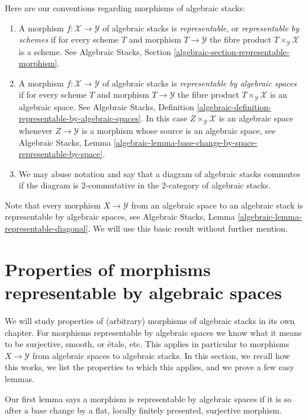 \documentclass{stacks-project}
\theoremstyle{plain}
\theoremstyle{definition}
\theoremstyle{remark}
\numberwithin{equation}{subsection}
\begin{document}
Here are our conventions regarding morphisms of algebraic stacks:
\begin{enumerate}
\item A morphism $f : \mathcal{X} \to \mathcal{Y}$
of algebraic stacks is {\it representable}, or
{\it representable by schemes} if for every scheme
$T$ and morphism $T \to \mathcal{Y}$ the fibre product
$T \times_\mathcal{Y} \mathcal{X}$ is a scheme.
See
Algebraic Stacks, Section \ref{algebraic-section-representable-morphism}.
\item A morphism $f : \mathcal{X} \to \mathcal{Y}$
of algebraic stacks is {\it representable by algebraic spaces}
if for every scheme $T$ and morphism $T \to \mathcal{Y}$ the fibre product
$T \times_\mathcal{Y} \mathcal{X}$ is an algebraic space.
See Algebraic Stacks,
Definition \ref{algebraic-definition-representable-by-algebraic-spaces}.
In this case $Z \times_\mathcal{Y} \mathcal{X}$ is an algebraic
space whenever $Z \to \mathcal{Y}$ is a morphism whose source is
an algebraic space, see
Algebraic Stacks,
Lemma \ref{algebraic-lemma-base-change-by-space-representable-by-space}.
\item We may abuse notation and say that a diagram of algebraic stacks
commutes if the diagram is $2$-commutative in the $2$-category of
algebraic stacks.
\end{enumerate}
Note that every morphism $X \to \mathcal{Y}$ from an algebraic space
to an algebraic stack is representable by algebraic spaces, see
Algebraic Stacks, Lemma \ref{algebraic-lemma-representable-diagonal}.
We will use this basic result without further mention.




\section{Properties of morphisms representable by algebraic spaces}
\label{section-properties-morphisms}

\noindent
We will study properties of (arbitrary) morphisms of algebraic stacks in its
own chapter. For morphisms representable by algebraic spaces we know what
it means to be surjective, smooth, or \'etale, etc. This applies in particular
to morphisms $X \to \mathcal{Y}$ from algebraic spaces to algebraic stacks.
In this section, we recall how this works, we list the properties to which
this applies, and we prove a few easy lemmas.

\medskip\noindent
Our first lemma says a morphism is representable by algebraic spaces
if it is so after a base change by a flat,
locally finitely presented, surjective morphism.
\end{document}
